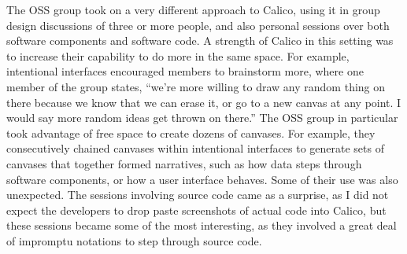The OSS group took on a very different approach to Calico, using it in group design discussions of three or more people, and also personal sessions over both software components and software code. A strength of Calico in this setting was to increase their capability to do more in the same space. For example, intentional interfaces encouraged members to brainstorm more, where one member of the group states, ``we're more willing to draw any random thing on there because we know that we can erase it, or go to a new canvas at any point. I would say more random ideas get thrown on there.'' The OSS group in particular took advantage of free space to create dozens of canvases. For example, they consecutively chained canvases within intentional interfaces to generate sets of canvases that together formed narratives, such as how data steps through software components, or how a user interface behaves. Some of their use was also unexpected. The sessions involving source code came as a surprise, as I did not expect the developers to drop paste screenshots of actual code into Calico, but these sessions became some of the most interesting, as they involved a great deal of impromptu notations to step through source code.


